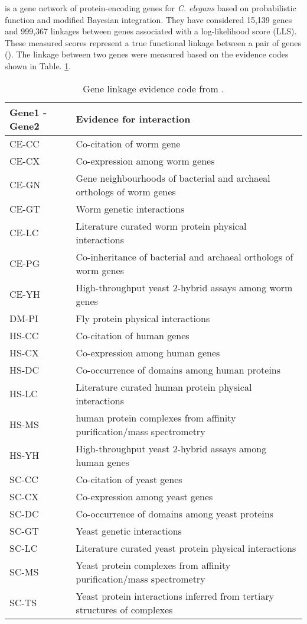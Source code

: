 \cite{WormNet} is a gene network of protein-encoding genes for \textit{C. elegans} based on probabilistic function and modified Bayesian integration. They have considered 15,139 genes and 999,367 linkages between genes associated with a log-likelihood score (LLS). These measured scores represent a true functional linkage between a pair of genes (\cite{Lee:2007}). The linkage between two genes were measured based on the evidence codes shown in Table. \ref{table:gene_linkage}.

\begin{table}[!htbp]
    {\renewcommand{\arraystretch}{1.5}
    \begin{tabularx}{0.99\textwidth}{ l X }
    \toprule
	\textbf{Gene1 - Gene2} & \textbf{Evidence for interaction}  \\
    \midrule
	CE-CC & Co-citation of worm gene \\
	CE-CX & Co-expression among worm genes \\
	CE-GN & Gene neighbourhoods of bacterial and archaeal orthologs of worm genes \\
	CE-GT & Worm genetic interactions \\
	CE-LC & Literature curated worm protein physical interactions \\
	CE-PG & Co-inheritance of bacterial and archaeal orthologs of worm genes \\
	CE-YH & High-throughput yeast 2-hybrid assays among worm genes \\
	DM-PI & Fly protein physical interactions \\
	HS-CC & Co-citation of human genes \\
	HS-CX & Co-expression among human genes \\
	HS-DC & Co-occurrence of domains among human proteins \\
	HS-LC & Literature curated human protein physical interactions \\
	HS-MS & human protein complexes from affinity purification/mass spectrometry \\
	HS-YH & High-throughput yeast 2-hybrid assays among human genes \\
	SC-CC & Co-citation of yeast genes \\
	SC-CX & Co-expression among yeast genes \\
	SC-DC & Co-occurrence of domains among yeast proteins \\
	SC-GT & Yeast genetic interactions \\
	SC-LC & Literature curated yeast protein physical interactions \\
	SC-MS & Yeast protein complexes from affinity purification/mass spectrometry \\
	SC-TS & Yeast protein interactions inferred from tertiary structures of complexes \\
    \bottomrule
    \end{tabularx}
	  \caption[Gene linkage evidence code]
	  {Gene linkage evidence code from \cite{WormNet}.
	  \label{table:gene_linkage}}}
\end{table}

